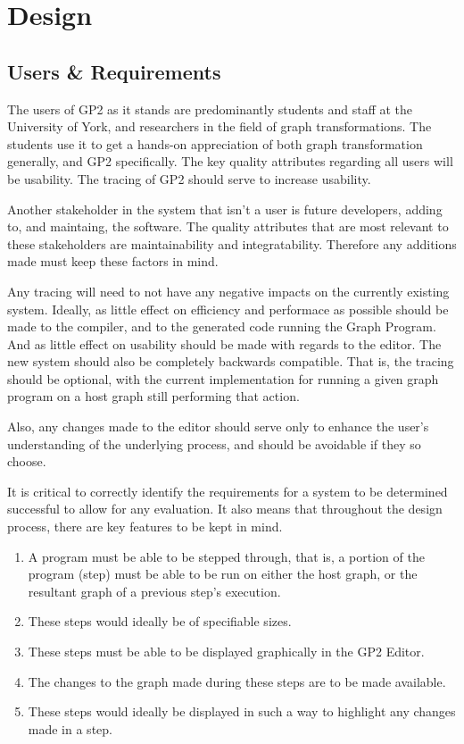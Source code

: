 \documentclass{UoYCSproject}
\begin{document}
\chapter{Design}
\section{Users \& Requirements}

The users of GP2 as it stands are predominantly students and staff at the University of York, and researchers in the field of graph transformations. The students use it to get a hands-on appreciation of both graph transformation generally, and GP2 specifically. The key quality attributes regarding all users will be usability. The tracing of GP2 should serve to increase usability. 

Another stakeholder in the system that isn't a user is future developers, adding to, and maintaing, the software. The quality attributes that are most relevant to these stakeholders are maintainability and integratability. Therefore any additions made must keep these factors in mind.

Any tracing will need to not have any negative impacts on the currently existing system. Ideally, as little effect on efficiency and performace as possible should be made to the compiler, and to the generated code running the Graph Program. And as little effect on usability should be made with regards to the editor. The new system should also be completely backwards compatible. That is, the tracing should be optional, with the current implementation for running a given graph program on a host graph still performing that action.

Also, any changes made to the editor should serve only to enhance the user's understanding of the underlying process, and should be avoidable if they so choose.

It is critical to correctly identify the requirements for a system to be determined successful to allow for any evaluation. It also means that throughout the design process, there are key features to be kept in mind.
\begin{enumerate}
	\item A program must be able to be stepped through, that is, a portion of the program (step) must be able to be run on either the host graph, or the resultant graph of a previous step's execution.
	\item These steps would ideally be of specifiable sizes.
	\item These steps must be able to be displayed graphically in the GP2 Editor.
	\item The changes to the graph made during these steps are to be made available.
	\item These steps would ideally be displayed in such a way to highlight any changes made in a step.
\end{enumerate}
\end{document}

